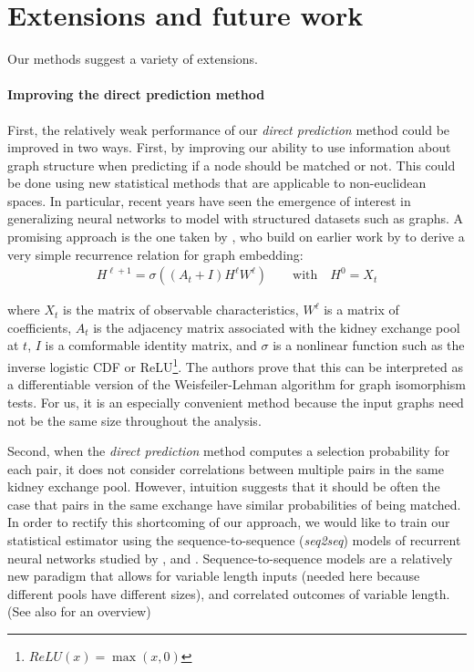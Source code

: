 \section{Extensions and future work} \label{sec:extensions}

Our methods suggest a variety of extensions. 


\paragraph{Improving the direct prediction method}

First, the relatively weak performance of our \emph{direct prediction} method could be improved in two ways. First, by improving our ability to use information about graph structure when predicting if a node should be matched or not. This could be done using new statistical methods that are applicable to non-euclidean spaces\citep{shuman2013emerging}. In particular, recent years have seen the emergence of interest in generalizing neural networks to model with structured datasets such as graphs. A promising approach is the one taken by \cite{kipf2016semi}, who build on earlier work by \cite{defferrard2016convolutional} to derive a very simple recurrence relation for graph embedding:
\begin{align}
  H^{\ell + 1} = \sigma((A_{t} + I) H^{\ell}W^{\ell}) \qquad \text{with} \quad H^{0} = X_{t}
\end{align}

\noindent where $X_{t}$ is the matrix of observable characteristics, $W^{\ell}$ is a matrix of coefficients, $A_{t}$ is the adjacency matrix associated with the kidney exchange pool at $t$, $I$ is a comformable identity matrix, and $\sigma$ is a nonlinear function such as the inverse logistic CDF or ReLU\footnote{$ReLU(x) = \max(x, 0)$}. The authors prove that this can be interpreted as a differentiable version of the Weisfeiler-Lehman algorithm for graph isomorphism tests. For us, it is an especially convenient method because the input graphs need not be the same size throughout the analysis. 


Second, when the \emph{direct prediction} method computes a selection probability for each pair, it does not consider correlations between multiple pairs in the same kidney exchange pool. However, intuition suggests that it should be often the case that pairs in the same exchange have similar probabilities of being matched. In order to rectify this shortcoming of our approach, we would like to train our statistical estimator using the sequence-to-sequence (\emph{seq2seq}) models of recurrent neural networks studied by \cite{sutskever2014sequence}, \cite{kalchbrenner2013recurrent} and \cite{cho2014learning}. Sequence-to-sequence models are a relatively new paradigm that allows for variable length inputs (needed here because different pools have different sizes), and correlated outcomes of variable length. (See also  \citep{lecun2015deep} for an overview)
 



